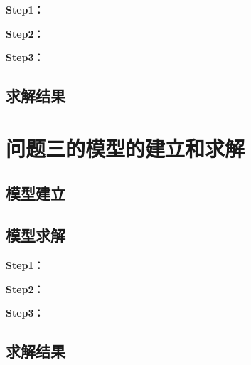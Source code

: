 \documentclass[withoutpreface,bwprint]{cumcmthesis}
\begin{document}
\textbf{Step1：} 

\textbf{Step2：} 

\textbf{Step3：} 

\subsection{求解结果}


\section{问题三的模型的建立和求解}
\subsection{模型建立}

\subsection{模型求解}

\textbf{Step1：} 

\textbf{Step2：} 

\textbf{Step3：} 

\subsection{求解结果}







\end{document}
